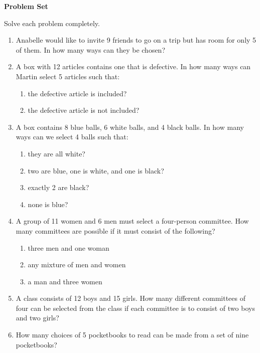 \textbf{Problem Set}

\vspce

Solve each problem completely.
\begin{enumerate}[label = \arabic*. ]
\item Anabelle would like to invite 9 friends to go on a trip but has room for only 5 of them. In how many ways can they be chosen?
\item A box with 12 articles contains one that is defective. In how many ways can Martin
select 5 articles such that: 
\begin{enumerate}[label = \alph*. ]
\item the defective article is included?
\item the defective article is not included?
\end{enumerate}  
\item A box contains 8 blue balls, 6 white balls, and 4 black balls. In how many ways can we select 4 balls such that: 
\begin{enumerate}[label = \alph*. ]
\item they are all white?
\item two are blue, one is white, and one is black?
\item exactly 2 are black?
\item none is blue?
\end{enumerate}  
\item A group of 11 women and 6 men must select a four-person committee. How many committees are possible if it must consist of the following?
\begin{enumerate}[label = \alph*. ]
\item three men and one woman
\item any mixture of men and women
\item a man and three women
\end{enumerate}  
\item A class consists of 12 boys and 15 girls. How many different committees of four can be selected from the class if each committee is to consist of two boys and two girls?
\item How many choices of 5 pocketbooks to read can be made from a set of nine pocketbooks?

\end{enumerate}   

